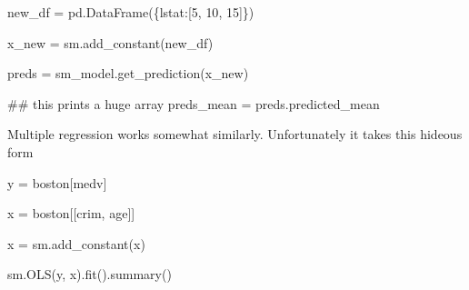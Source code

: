 \documentclass[
  letterpaper,
  DIV=11,
  numbers=noendperiod]{scrreprt}
\newenvironment{Shaded}{\begin{snugshade}}{\end{snugshade}}
\newcommand{\CommentTok}[1]{\textcolor[rgb]{0.37,0.37,0.37}{#1}}
\newcommand{\DecValTok}[1]{\textcolor[rgb]{0.68,0.00,0.00}{#1}}
\newcommand{\NormalTok}[1]{\textcolor[rgb]{0.00,0.23,0.31}{#1}}
\newcommand{\OperatorTok}[1]{\textcolor[rgb]{0.37,0.37,0.37}{#1}}
\newcommand{\StringTok}[1]{\textcolor[rgb]{0.13,0.47,0.30}{#1}}
\begin{document}
\begin{Shaded}
\begin{Highlighting}[]

\NormalTok{new\_df }\OperatorTok{=}\NormalTok{ pd.DataFrame(\{}\StringTok{\textquotesingle{}lstat\textquotesingle{}}\NormalTok{:[}\DecValTok{5}\NormalTok{, }\DecValTok{10}\NormalTok{, }\DecValTok{15}\NormalTok{]\})}

\NormalTok{x\_new }\OperatorTok{=}\NormalTok{ sm.add\_constant(new\_df)}

\NormalTok{preds }\OperatorTok{=}\NormalTok{ sm\_model.get\_prediction(x\_new)}

\CommentTok{\#\# this prints a huge array}
\NormalTok{preds\_mean }\OperatorTok{=}\NormalTok{ preds.predicted\_mean}
\end{Highlighting}
\end{Shaded}

Multiple regression works somewhat similarly. Unfortunately it takes
this hideous form

\begin{Shaded}
\begin{Highlighting}[]
\NormalTok{y }\OperatorTok{=}\NormalTok{ boston[}\StringTok{\textquotesingle{}medv\textquotesingle{}}\NormalTok{]}

\NormalTok{x }\OperatorTok{=}\NormalTok{ boston[[}\StringTok{\textquotesingle{}crim\textquotesingle{}}\NormalTok{, }\StringTok{\textquotesingle{}age\textquotesingle{}}\NormalTok{]]}

\NormalTok{x }\OperatorTok{=}\NormalTok{ sm.add\_constant(x)}

\NormalTok{sm.OLS(y, x).fit().summary()}
\end{Highlighting}
\end{Shaded}
\end{document}
